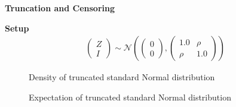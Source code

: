 \begin{frame}\begin{center}
	\LARGE\textbf{Truncation and Censoring}
\end{center}\end{frame}
\begin{frame}
	\textbf{Setup}\\
	\begin{align*}
	\begin{pmatrix}
	Z \\
	I
	\end{pmatrix}  \sim \mathcal{N} \left(
	\begin{pmatrix}
	0 \\
	0
	\end{pmatrix} , \begin{pmatrix}
	1.0  &  \rho \\
	\rho &  1.0
	\end{pmatrix} \right)
	\end{align*}

\end{frame}
\begin{frame}
\begin{figure}[htp]\centering
\caption{Density of truncated standard Normal distribution}
\end{figure}
\end{frame}

\begin{frame}
\begin{figure}[htp]\centering
\caption{Expectation of truncated standard Normal distribution}
\end{figure}
\end{frame}

